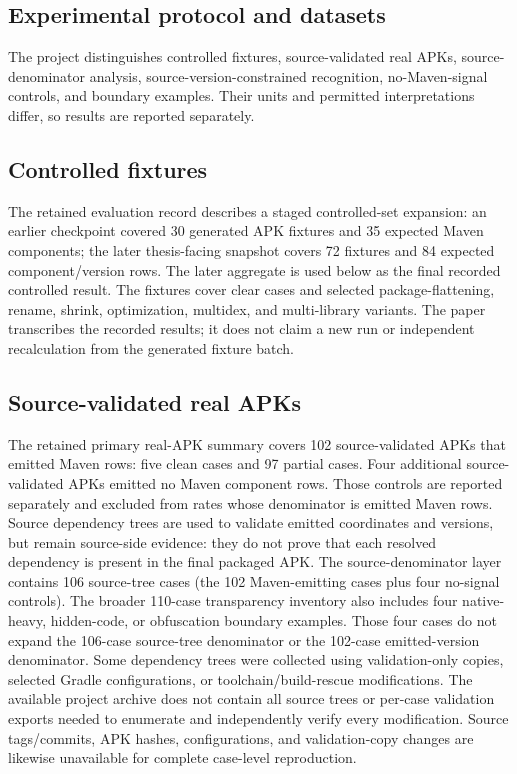 \documentclass[10pt,twocolumn]{article}
\begin{document}
\subsection{Experimental protocol and datasets}
The project distinguishes controlled fixtures, source-validated real APKs, source-denominator analysis, source-version-constrained recognition, no-Maven-signal controls, and boundary examples. Their units and permitted interpretations differ, so results are reported separately.
\subsection{Controlled fixtures}
The retained evaluation record describes a staged controlled-set expansion: an earlier checkpoint covered 30 generated APK fixtures and 35 expected Maven components; the later thesis-facing snapshot covers 72 fixtures and 84 expected component/version rows. The later aggregate is used below as the final recorded controlled result. The fixtures cover clear cases and selected package-flattening, rename, shrink, optimization, multidex, and multi-library variants. The paper transcribes the recorded results; it does not claim a new run or independent recalculation from the generated fixture batch.
\subsection{Source-validated real APKs}
The retained primary real-APK summary covers 102 source-validated APKs that emitted Maven rows: five clean cases and 97 partial cases. Four additional source-validated APKs emitted no Maven component rows. Those controls are reported separately and excluded from rates whose denominator is emitted Maven rows. Source dependency trees are used to validate emitted coordinates and versions, but remain source-side evidence: they do not prove that each resolved dependency is present in the final packaged APK.
The source-denominator layer contains 106 source-tree cases (the 102 Maven-emitting cases plus four no-signal controls). The broader 110-case transparency inventory also includes four native-heavy, hidden-code, or obfuscation boundary examples. Those four cases do not expand the 106-case source-tree denominator or the 102-case emitted-version denominator.
Some dependency trees were collected using validation-only copies, selected Gradle configurations, or toolchain/build-rescue modifications. The available project archive does not contain all source trees or per-case validation exports needed to enumerate and independently verify every modification. Source tags/commits, APK hashes, configurations, and validation-copy changes are likewise unavailable for complete case-level reproduction.
\end{document}
